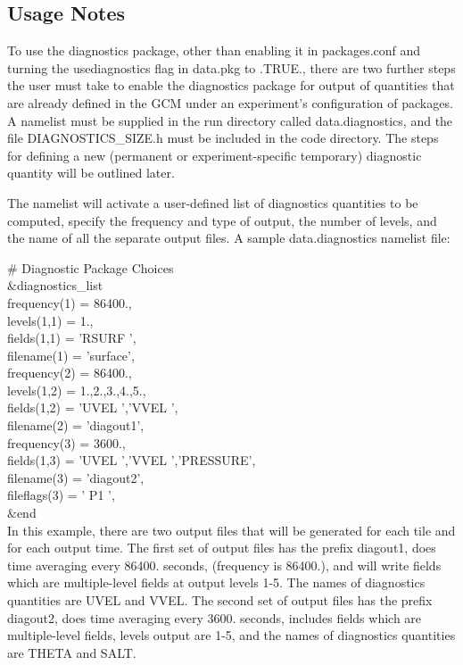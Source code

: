 \subsection{Usage Notes}
\label{sec:diagnostics:usersguide}

\noindent
To use the diagnostics package, other than enabling it in packages.conf
and turning the usediagnostics flag in data.pkg to .TRUE., there are two
further steps the user must take to enable the diagnostics package for
output of quantities that are already defined in the GCM under an experiment's
configuration of packages.  A namelist must be supplied in the run directory 
called data.diagnostics, and the file DIAGNOSTICS\_SIZE.h must be included in the 
code directory.  The steps for defining a new (permanent or experiment-specific 
temporary) diagnostic quantity will be outlined later. 

\noindent The namelist will activate a user-defined list of diagnostics quantities 
to be computed, specify the frequency and type of output, the number of levels, and 
the name of all the separate output files. A sample data.diagnostics namelist file:

\noindent
$\#$ Diagnostic Package Choices \\
 $\&$diagnostics\_list \\
  frequency(1) = 86400., \ \\
   levels(1,1) = 1., \ \\
   fields(1,1) = 'RSURF   ', \ \\
   filename(1) = 'surface', \ \\
  frequency(2) = 86400., \ \\
   levels(1,2) = 1.,2.,3.,4.,5., \ \\
   fields(1,2) = 'UVEL    ','VVEL    ', \ \\
   filename(2) = 'diagout1', \ \\
  frequency(3) = 3600., \ \\
   fields(1,3) = 'UVEL    ','VVEL    ','PRESSURE', \ \\
   filename(3) = 'diagout2', \ \\
  fileflags(3) = ' P1     ', \ \\
 $\&$end \ \\

\noindent
In this example, there are two output files that will be generated
for each tile and for each output time. The first set of output files
has the prefix diagout1, does time averaging every 86400. seconds,
(frequency is 86400.), and will write fields which are multiple-level 
fields at output levels 1-5. The names of diagnostics quantities are 
UVEL and VVEL.  The second set of output files
has the prefix diagout2, does time averaging every 3600. seconds,
includes fields which are multiple-level fields, levels output are 1-5,
and the names of diagnostics quantities are THETA and SALT.

